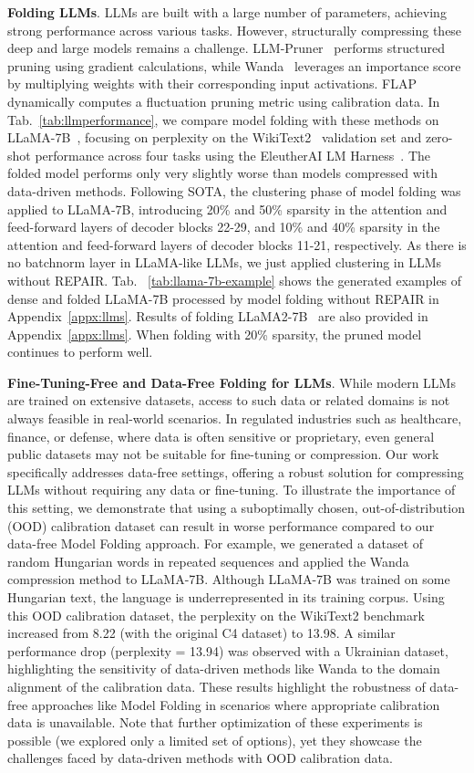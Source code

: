 \documentclass{article}
\newcommand\fakeparagraph[1]{\par\noindent\textbf{{#1}}.\xspace}
\begin{document}
{\fakeparagraph{Folding LLMs}
LLMs are built with a large number of parameters, achieving strong performance across various tasks. However, structurally compressing these deep and large models remains a challenge. LLM-Pruner~\citep{llmpruner} performs structured pruning using gradient calculations, while Wanda~\citep{wanda} leverages an importance score by multiplying weights with their corresponding input activations. FLAP~\citep{flap} dynamically computes a fluctuation pruning metric using calibration data. In Tab.~\ref{tab:llmperformance}, we compare model folding with these methods on LLaMA-7B~\citep{llama}, focusing on perplexity on the WikiText2~\citep{wikitext2} validation set and zero-shot performance across four tasks using the EleutherAI LM Harness~\citep{eval-harness}. The folded model performs only very slightly worse than models compressed with data-driven methods. Following SOTA, the clustering phase of model folding was applied to LLaMA-7B, introducing 20\% and 50\% sparsity in the attention and feed-forward layers of decoder blocks 22-29, and 10\% and 40\% sparsity in the attention and feed-forward layers of decoder blocks 11-21, respectively. As there is no batchnorm layer in LLaMA-like LLMs, we just applied clustering in LLMs without REPAIR. Tab. ~\ref{tab:llama-7b-example} shows the generated examples of dense and folded LLaMA-7B processed by model folding without REPAIR in Appendix~\ref{appx:llms}. Results of folding LLaMA2-7B~\citep{llama2} are also provided in Appendix~\ref{appx:llms}. When folding with 20\% sparsity, the pruned model continues to perform well.

\fakeparagraph{Fine-Tuning-Free and Data-Free Folding for LLMs}
While modern LLMs are trained on extensive datasets, access to such data or related domains is not always feasible in real-world scenarios. In regulated industries such as healthcare, finance, or defense, where data is often sensitive or proprietary, even general public datasets may not be suitable for fine-tuning or compression. Our work specifically addresses data-free settings, offering a robust solution for compressing LLMs without requiring any data or fine-tuning.
To illustrate the importance of this setting, we demonstrate that using a suboptimally chosen, out-of-distribution (OOD) calibration dataset can result in worse performance compared to our data-free Model Folding approach. For example, we generated a dataset of random Hungarian words in repeated sequences and applied the Wanda compression method to LLaMA-7B. Although LLaMA-7B was trained on some Hungarian text, the language is underrepresented in its training corpus. Using this OOD calibration dataset, the perplexity on the WikiText2 benchmark increased from 8.22 (with the original C4 dataset) to 13.98. A similar performance drop (perplexity = 13.94) was observed with a Ukrainian dataset, highlighting the sensitivity of data-driven methods like Wanda to the domain alignment of the calibration data. These results highlight the robustness of data-free approaches like Model Folding in scenarios where appropriate calibration data is unavailable. Note that further optimization of these experiments is possible (we explored only a limited set of options), yet they showcase the challenges faced by data-driven methods with OOD calibration data.


}
\end{document}
